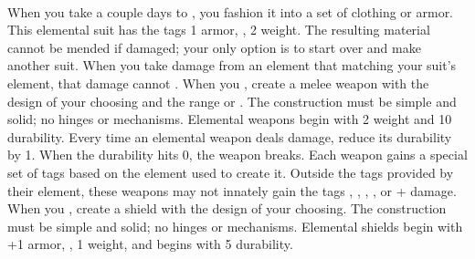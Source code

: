 \documentclass[]{dw_playbook}
\begin{document}
\pageThree[s]
    {
        \begin{minipage}[t]{\textwidth}
            \\
        \end{minipage}
    }
    {
        \gap
            {When you take a couple days to , you fashion it into a set of clothing or armor.  This elemental suit has the tags 1 armor, , 2 weight.  The resulting material cannot be mended if damaged; your only option is to start over and make another suit.
            \gap
            When you take damage from an element that matching your suit’s element, that damage cannot .}
        \gap
            {When you , create a melee weapon with the design of your choosing and the range  or .
            \gap
            The construction must be simple and solid; no hinges or mechanisms.  Elemental weapons begin with 2 weight and 10 durability.  Every time an elemental weapon deals damage, reduce its durability by 1.  When the durability hits 0, the weapon breaks.
            \gap
            Each weapon gains a special set of tags based on the element used to create it.  Outside the tags provided by their element, these weapons may not innately gain the tags , , , , or + damage.
            \gap
            \gapSm
            \gapSm
            }
        \gap
            {When you , create a shield with the design of your choosing.  The construction must be simple and solid; no hinges or mechanisms.  Elemental shields begin with +1 armor, , 1 weight, and begins with 5 durability.
}}
\end{document}
